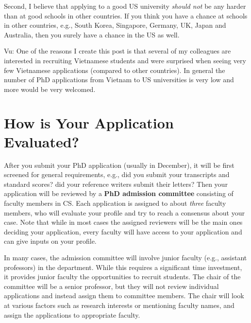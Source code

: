 \documentclass[10pt]{article}
\begin{document}
Second, I believe that applying to a good US university \emph{should not} be any
harder than at good schools in other countries. If you think you have a
chance at schools in other countries, e.g., South Korea, Singapore, Germany, UK, Japan and Australia, then you surely have a chance in
the US as well.

\begin{tcolorbox}[left=1pt,right=1pt,top=1pt,bottom=1pt]
Vu: One of the reasons I create this post is that several of my colleagues are interested in 
recruiting Vietnamese students and were surprised when seeing very few Vietnamese applications (compared to other countries). In general the number of
PhD applications from Vietnam to US universities is very low and  more would be very welcomed. 
\end{tcolorbox}



\section{How is Your Application Evaluated?}

After you submit your PhD application (usually in December), it will be first screened
for general requirements, e.g., did you submit your transcripts and standard scores? did your reference writers submit their letters?
Then your application will be reviewed by a
\textbf{PhD admission committee} consisting of faculty members in CS. Each application is assigned to about \emph{three} faculty members, who will evaluate your profile and try to reach a consensus about your case.  Note that while in most cases the assigned reviewers will be the main ones deciding your application, every faculty will have access to your application and can give inputs on your profile.

In many cases, the admission committee will involve junior faculty (e.g., assistant professors) in the department. While this requires  a significant time investment, it provides junior faculty the opportunities to recruit students. The chair of the committee will be a senior professor, but they will not review individual applications and instead assign them to committee members. The chair will look at various factors such as research interests or mentioning faculty names, and assign the applications to appropriate faculty. 
\end{document}
